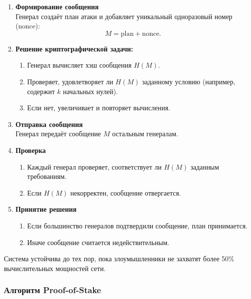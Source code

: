 \begin{enumerate}

    \item \textbf{Формирование сообщения}\\
    Генерал создаёт план атаки и добавляет уникальный одноразовый номер (nonce):
    \[
    M = \text{plan} + \text{nonce}.
    \]

    \item \textbf{Решение криптографической задачи:}
    \begin{enumerate}
        \item Генерал вычисляет хэш сообщения $H(M)$.
        \item Проверяет, удовлетворяет ли $H(M)$ заданному условию (например, содержит $k$ начальных нулей).
        \item Если нет, увеличивает  и повторяет вычисления.
    \end{enumerate}

    \item \textbf{Отправка сообщения}\\
    Генерал передаёт сообщение $M$ остальным генералам.

    \item \textbf{Проверка}
    \begin{enumerate}
        \item Каждый генерал проверяет, соответствует ли $H(M)$ заданным требованиям.
        \item Если $H(M)$ некорректен, сообщение отвергается.
    \end{enumerate}

    \item \textbf{Принятие решения}
    \begin{enumerate}
        \item Если большинство генералов подтвердили сообщение, план принимается.
        \item Иначе сообщение считается недействительным.
    \end{enumerate}
\end{enumerate}

Система устойчива до тех пор, пока злоумышленники не захватят более 50\% вычислительных мощностей сети.~\cite{pogorelov}


\subsubsection{Алгоритм Proof-of-Stake}

